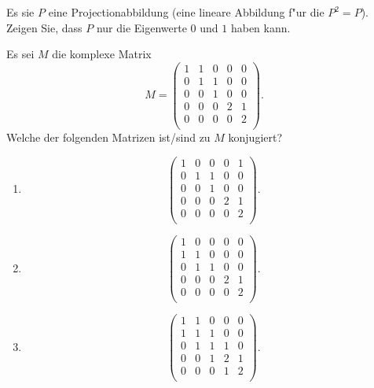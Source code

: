 \documentclass[a4paper]{article}
\begin{document}
\begin{klaufg}{8}{}

Es sie $P$ eine Projectionabbildung (eine lineare Abbildung f"ur die $P^2 = P$). Zeigen Sie, dass $P$ nur die Eigenwerte $0$ und $1$ haben kann.

\end{klaufg}

\begin{klaufg}{8}{}

Es sei $M$ die komplexe Matrix
\[
M = \begin{pmatrix}
1 & 1 & 0 & 0 & 0 \\
0 & 1 & 1 & 0 & 0 \\
0 & 0 & 1 & 0 & 0 \\
0 & 0 & 0 & 2 & 1 \\
0 & 0 & 0 & 0 & 2 \\
\end{pmatrix}.
\]
Welche der folgenden Matrizen ist/sind zu $M$ konjugiert?
\begin{enumerate}
\item
\[
\begin{pmatrix}
1 & 0 & 0 & 0 & 1 \\
0 & 1 & 1 & 0 & 0 \\
0 & 0 & 1 & 0 & 0 \\
0 & 0 & 0 & 2 & 1 \\
0 & 0 & 0 & 0 & 2 \\
\end{pmatrix}.
\]
\item
\[
\begin{pmatrix}
1 & 0 & 0 & 0 & 0 \\
1 & 1 & 0 & 0 & 0 \\
0 & 1 & 1 & 0 & 0 \\
0 & 0 & 0 & 2 & 1 \\
0 & 0 & 0 & 0 & 2 \\
\end{pmatrix}.
\]
\item
\[
\begin{pmatrix}
1 & 1 & 0 & 0 & 0 \\
1 & 1 & 1 & 0 & 0 \\
0 & 1 & 1 & 1 & 0 \\
0 & 0 & 1 & 2 & 1 \\
0 & 0 & 0 & 1 & 2 \\
\end{pmatrix}.
\]
\end{enumerate}

\end{klaufg}
\end{document}

